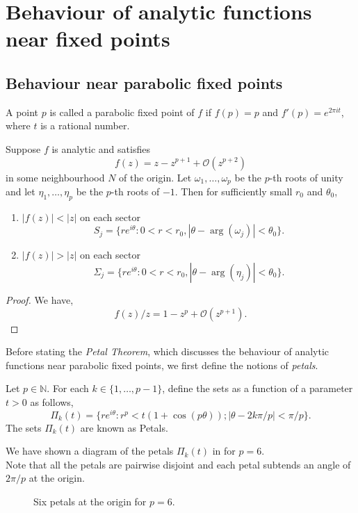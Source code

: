 \chapter{Behaviour of analytic functions near fixed points}
\section{Behaviour near parabolic fixed points}
A point \( p \) is called a parabolic fixed point of \( f \)
if \( f(p)=p \) and \( f'(p)=e^{2\pi i t} \), where \( t \)
is a rational number.

\begin{lemma}
	Suppose \( f \) is analytic and satisfies \[
		f(z)=z-z^{p+1}+\mathcal{O}(z^{p+2})
	\] in some neighbourhood \( N \) of the origin. Let \( \omega_1,\ldots ,\omega_p \) be the \( p \)-th
	roots of unity and let \( \eta_1,\ldots ,\eta_p \) be the \( p \)-th roots of \( -1 \).
	Then for sufficiently small \( r_0 \) and \( \theta _0 \), 
	\begin{enumerate}
		\item \( |f(z)|<|z| \) on each sector \[
				S_j=\{re^{i\theta}:0<r<r_0,|\theta -\arg(\omega_j)|<\theta _0\}
		.\] 
	\item \( |f(z)|>|z| \) on each sector \[
				\Sigma_j=\{re^{i\theta}:0<r<r_0,|\theta -\arg(\eta_j)|<\theta _0\}
	.\] 
	\end{enumerate}
\end{lemma}
\begin{proof}
	We have, \[
		f(z) /z=1-z^p+\mathcal{O}(z^{p+1})
	.\] 
\end{proof}

Before stating the \emph{Petal Theorem}, which discusses the
behaviour of analytic functions near parabolic fixed points, we first define the notions
of \emph{petals}.
\begin{definition}[Petals]
	Let \( p\in \mathbb{N} \). For each \( k\in\{1,\ldots ,p-1\} \), define the sets as a function of a parameter \( t>0 \)
	as follows, \[
		\Pi_k(t)=\{re^{i\theta}:r^p<t(1+\cos (p\theta));|\theta-2k\pi /p|<\pi /p\}
	.\] 
	The sets \( \Pi_k(t) \) are known as Petals.
\end{definition}
We have shown a diagram of the petals \( \Pi_k(t) \) in  for \( p=6 \).\\
Note that all the petals are pairwise disjoint and each petal subtends an angle of \( 2\pi /p \) at the origin.

\begin{figure}[ht]
	\centering
	\caption{Six petals at the origin for $p=6$.}
	\label{petals}
\end{figure}

